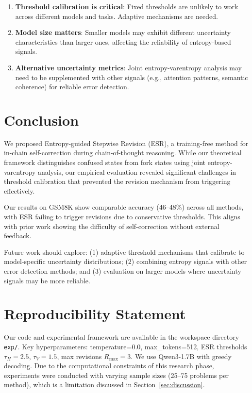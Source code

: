 \documentclass{article}
\begin{document}
\begin{enumerate}
    \item \textbf{Threshold calibration is critical}: Fixed thresholds are unlikely to work across different models and tasks. Adaptive mechanisms are needed.
    \item \textbf{Model size matters}: Smaller models may exhibit different uncertainty characteristics than larger ones, affecting the reliability of entropy-based signals.
    \item \textbf{Alternative uncertainty metrics}: Joint entropy-varentropy analysis may need to be supplemented with other signals (e.g., attention patterns, semantic coherence) for reliable error detection.
\end{enumerate}

\section{Conclusion}
\label{sec:conclusion}

We proposed Entropy-guided Stepwise Revision (ESR), a training-free method for in-chain self-correction during chain-of-thought reasoning. While our theoretical framework distinguishes confused states from fork states using joint entropy-varentropy analysis, our empirical evaluation revealed significant challenges in threshold calibration that prevented the revision mechanism from triggering effectively.

Our results on GSM8K show comparable accuracy (46--48\%) across all methods, with ESR failing to trigger revisions due to conservative thresholds. This aligns with prior work \citep{huang2024selfcorrect} showing the difficulty of self-correction without external feedback.

Future work should explore: (1) adaptive threshold mechanisms that calibrate to model-specific uncertainty distributions; (2) combining entropy signals with other error detection methods; and (3) evaluation on larger models where uncertainty signals may be more reliable.

\section*{Reproducibility Statement}

Our code and experimental framework are available in the workspace directory \texttt{exp/}. Key hyperparameters: temperature=0.0, max\_tokens=512, ESR thresholds $\tau_H=2.5$, $\tau_V=1.5$, max revisions $R_{\max}=3$. We use Qwen3-1.7B with greedy decoding. Due to the computational constraints of this research phase, experiments were conducted with varying sample sizes (25--75 problems per method), which is a limitation discussed in Section~\ref{sec:discussion}.
\end{document}
